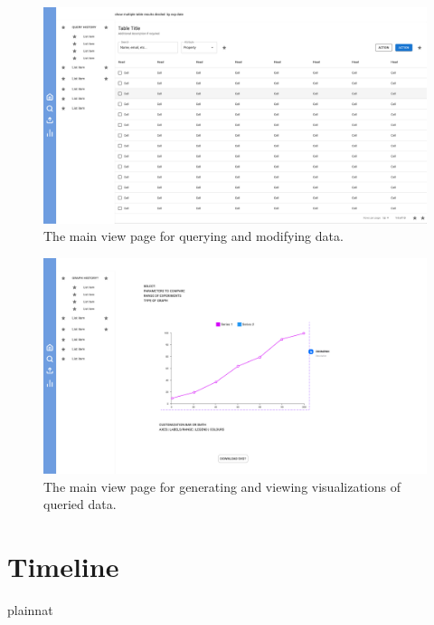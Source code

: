 \documentclass[12pt, titlepage]{article}
\begin{document}
\begin{figure}[htbp]
  \centering
  \includegraphics[width=\textwidth]{Figma/table.pdf}
  \caption{The main view page for querying and modifying data.}
  \label{fig:FigUITB}
\end{figure}

\begin{figure}[htbp]
  \centering
  \includegraphics[width=\textwidth]{Figma/graphs.pdf}
  \caption{The main view page for generating and viewing visualizations of queried data.}
  \label{fig:FigUIG}
\end{figure}

\section{Timeline}



 {plainnat}


\newpage{}
\end{document}
